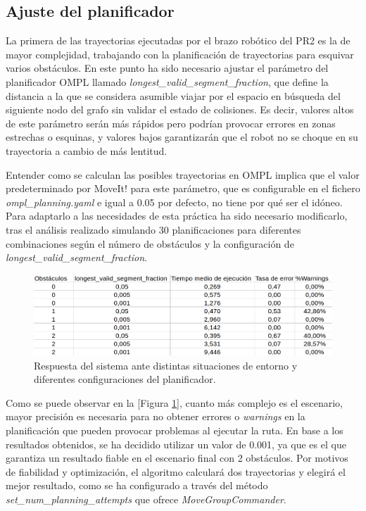 \documentclass[12pt,spanish,chapterprefix, numbers=noenddot]{book}
\numberwithin{equation}{section}
\numberwithin{figure}{section}
\begin{document}
\subsection{Ajuste del planificador}

La primera de las trayectorias ejecutadas por el brazo robótico del PR2 es la de mayor complejidad, trabajando con la planificación de trayectorias para esquivar varios obstáculos. En este punto ha sido necesario ajustar el parámetro del planificador OMPL llamado \textit{longest\_valid\_segment\_fraction}, que define la distancia a la que se considera asumible viajar por el espacio en búsqueda del siguiente nodo del grafo sin validar el estado de colisiones. Es decir, valores altos de este parámetro serán más rápidos pero podrían provocar errores en zonas estrechas o esquinas, y valores bajos garantizarán que el robot no se choque en su trayectoria a cambio de más lentitud. 

Entender como se calculan las posibles trayectorias en OMPL implica que el valor predeterminado por MoveIt! para este parámetro, que es configurable en el fichero \textit{ompl\_planning.yaml} e igual a 0.05 por defecto, no tiene por qué ser el idóneo. Para adaptarlo a las necesidades de esta práctica ha sido necesario modificarlo, tras el análisis  realizado simulando 30 planificaciones para diferentes combinaciones según el número de obstáculos y la configuración de \textit{longest\_valid\_segment\_fraction}. 
\begin{figure}[hbt!]
\centering
\includegraphics[width=14cm]{Figs/analisis_ejecuciones.png}
\par
\caption{\label{fig:analisis_ejecuciones}Respuesta del sistema ante distintas situaciones de entorno y diferentes configuraciones del planificador.}
\end{figure}
Como se puede observar en la [Figura \ref{fig:analisis_ejecuciones}], cuanto más complejo es el escenario, mayor precisión es necesaria para no obtener errores o \textit{warnings} en la planificación que pueden provocar problemas al ejecutar la ruta. En base a los resultados obtenidos, se ha decidido utilizar un valor de 0.001, ya que es el que garantiza un resultado fiable en el escenario final con 2 obstáculos. Por motivos de fiabilidad y optimización, el algoritmo calculará dos trayectorias y elegirá el mejor resultado, como se ha configurado a través del método \textit{set\_num\_planning\_attempts} que ofrece \textit{MoveGroupCommander}. 
\end{document}
